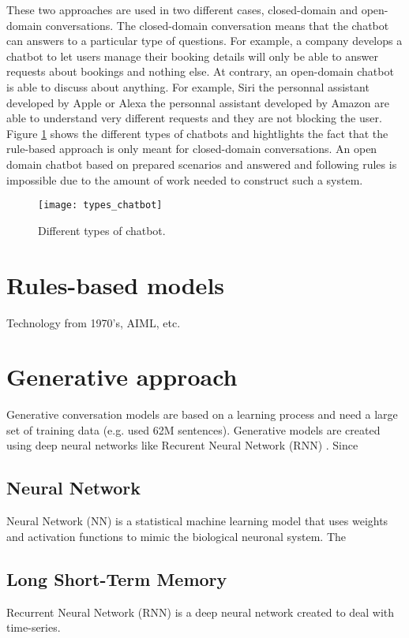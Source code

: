 These two approaches are used in two different cases, closed-domain and open-domain conversations. The closed-domain conversation means that the chatbot can answers to a particular type of questions. For example, a company develops a chatbot to let users manage their booking details will only be able to answer requests about bookings and nothing else. At contrary, an open-domain chatbot is able to discuss about anything. For example, Siri the personnal assistant developed by Apple or Alexa the personnal assistant developed by Amazon are able to understand very different requests and they are not blocking the user. Figure \ref{fig:types_chatbot} shows the different types of chatbots and hightlights the fact that the rule-based approach is only meant for closed-domain conversations. An open domain chatbot based on prepared scenarios and answered and following rules is impossible due to the amount of work needed to construct such a system.

\begin{figure}
    \centering
    \texttt{[image: types\_chatbot]}
    \caption{Different types of chatbot.}
    \label{fig:types_chatbot}
\end{figure}

\section{Rules-based models}
Technology from 1970's, AIML, etc.

\section{Generative approach}
Generative conversation models are based on a learning process and need a large set of training data (e.g. \cite{1506.05869} used 62M sentences). Generative models are created using deep neural networks like Recurent Neural Network (RNN) \citep{1503.02364,1506.05869}. Since

\subsection{Neural Network}
Neural Network (NN) is a statistical machine learning model that uses weights and activation functions to mimic the biological neuronal system. The

\subsection{Long Short-Term Memory}
Recurrent Neural Network (RNN) is a deep neural network created to deal with time-series.

